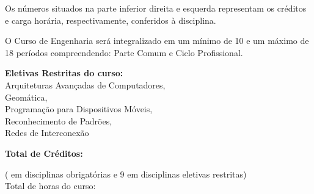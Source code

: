 \documentclass[a4paper, landscape]{article}
\newcounter{cred}
\newcounter{thoras}
\begin{document}
\vspace{1mm}
\setlength\parindent{0pt}
\begin{multicols}{5}

\columnbreak
Os números situados na parte inferior direita e esquerda representam os créditos e carga horária, respectivamente, conferidos à disciplina.

\columnbreak
O Curso de Engenharia será integralizado em um mínimo de 10 e um máximo de 18 períodos compreendendo: Parte Comum e Ciclo Profissional.

\columnbreak
\textbf{Eletivas Restritas do curso:}\\
Arquiteturas Avançadas de Computadores,\\
Geomática,\\
Programação para Dispositivos Móveis,\\
Reconhecimento de Padrões,\\ 
Redes de Interconexão

\columnbreak
\textbf{Total de Créditos:} \the\value{cred}\\
	\addtocounter{cred}{-9}
	(\the\value{cred} em disciplinas obrigatórias e 9 em disciplinas eletivas restritas)\\
	Total de horas do curso: \the\value{thoras}
\end{multicols}
\end{document}
